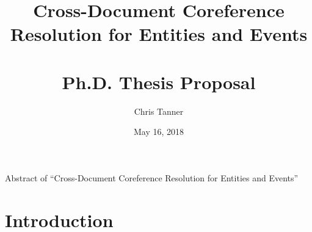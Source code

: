 \documentclass[10pt,oneside,openany]{brownthesis}
\begin{document}
\newcommand{\thesistitle}{Cross-Document Coreference Resolution for Entities and Events}
\author{Chris Tanner}
\title{\thesistitle\\~\\ Ph.D. Thesis Proposal}
\date{May 16, 2018}

\frontmatter %

\maketitle %

\mainmatter %


\def\abstract#1{\gdef\d@abstract{#1}}
\def\d@abstract{}
\def\abstractpage{%
  \thispagestyle{empty}
  \noindent Abstract of ``\thesistitle''
  \\
  
  \vfill}
\abstractpage
{
\singlespacing
\hypersetup{linkcolor=black}
\tableofcontents %
\doublespacing
}
\chapter{Introduction}

\backmatter %


\end{document}
